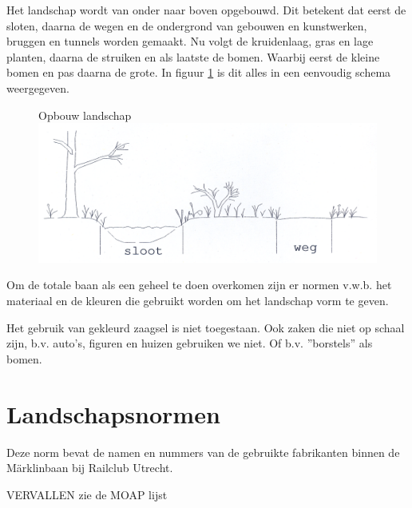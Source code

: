 \documentclass[12pt,a4paper]{report}
\begin{document}
Het landschap wordt van onder naar boven opgebouwd.
Dit betekent dat eerst de sloten, daarna de wegen en de ondergrond van gebouwen en kunstwerken, bruggen en tunnels worden gemaakt.
Nu volgt de kruidenlaag, gras en lage planten, daarna de struiken en als laatste de bomen.
Waarbij eerst de kleine bomen en pas daarna de grote.
In figuur \ref{figuur12} is dit alles in een eenvoudig schema weergegeven.

\begin{figure}[ht]
  \captionbox
  {Opbouw landschap\label{figuur12}}
  {\includegraphics[scale=1.0]{images/rcu_figuur12}}
\end{figure}

Om de totale baan als een geheel te doen overkomen zijn er normen v.w.b. het materiaal en de kleuren die gebruikt worden om het landschap vorm te geven.

Het gebruik van gekleurd zaagsel is niet toegestaan. Ook zaken die niet op schaal zijn, b.v. auto's, figuren en huizen gebruiken we niet. Of b.v. ''borstels'' als bomen.

\section{Landschapsnormen}

Deze norm bevat de namen en nummers van de gebruikte fabrikanten binnen de M\"{a}rklinbaan bij Railclub Utrecht.

VERVALLEN  zie de MOAP lijst
\end{document}
